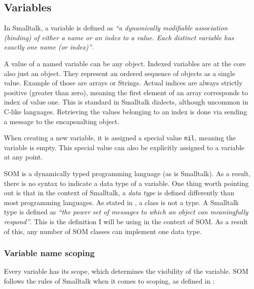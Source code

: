 \documentclass[thesis=M,english]{FITthesis}[2019/12/23]
\begin{document}
\subsection{Variables}
In Smalltalk, a variable is defined as \textit{``a dynamically modifiable association (binding) of either a name
or an index to a value. Each distinct variable has exactly one name (or index)''}\cite{smalltalk-essentials}.

A value of a named variable can be any object. Indexed variables are at the core also just an object. They
represent an ordered sequence of objects as a single value. Example of those are arrays or Strings. Actual
indices are always strictly positive (greater than zero), meaning the first element of an array corresponds
to index of value one. This is standard in Smalltalk dialects, although uncommon in C-like languages. Retrieving
the values belonging to an index is done via sending a message to the encapsualting object.

When creating a new variable, it is assigned a special value \texttt{nil}, meaning the variable is empty. This
special value can also be explicitly assigned to a variable at any point.

SOM is a dynamically typed programming language (as is Smalltalk). As a result, there is no syntax to indicate
a data type of a variable. One thing worth pointing out is that in the context of Smalltalk, a \textit{data type}
is defined differently than most programming languages. As stated in \cite{smalltalk-essentials}, a class is not
a type. A Smalltalk type is defined as \textit{``the power set of messages to which an object can meaningfully
respond''}\cite{smalltalk-essentials}. This is the definition I will be using in the context of SOM. As a result
of this, any number of SOM classes can implement one data type.

\subsubsection{Variable name scoping}
Every variable has its scope, which determines the visibility of the variable. SOM follows the rules of Smalltalk
when it comes to scoping, as defined in \cite{smalltalk-essentials}:
\end{document}
